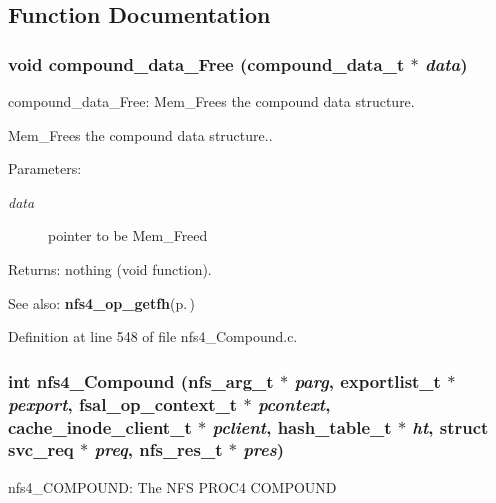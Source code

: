 \subsection{Function Documentation}
\subsubsection{\setlength{\rightskip}{0pt plus 5cm}void compound\_\-data\_\-Free (compound\_\-data\_\-t $\ast$ {\em data})}\label{nfs4__Compound_8c_a6}


compound\_\-data\_\-Free: Mem\_\-Frees the compound data structure.

Mem\_\-Frees the compound data structure..

\begin{Desc}
\item[Parameters:]
\begin{description}
\item[{\em data}]pointer to be Mem\_\-Freed\end{description}
\end{Desc}
\begin{Desc}
\item[Returns:]nothing (void function).\end{Desc}
\begin{Desc}
\item[See also:]{\bf nfs4\_\-op\_\-getfh}{\rm (p.\,\pageref{nfs4__op__getfh_8c_a0})} \end{Desc}


Definition at line 548 of file nfs4\_\-Compound.c.
\subsubsection{\setlength{\rightskip}{0pt plus 5cm}int nfs4\_\-Compound (nfs\_\-arg\_\-t $\ast$ {\em parg}, exportlist\_\-t $\ast$ {\em pexport}, fsal\_\-op\_\-context\_\-t $\ast$ {\em pcontext}, cache\_\-inode\_\-client\_\-t $\ast$ {\em pclient}, hash\_\-table\_\-t $\ast$ {\em ht}, struct svc\_\-req $\ast$ {\em preq}, nfs\_\-res\_\-t $\ast$ {\em pres})}\label{nfs4__Compound_8c_a4}


nfs4\_\-COMPOUND: The NFS PROC4 COMPOUND

